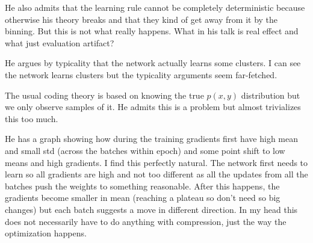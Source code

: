 He also admits that the learning rule cannot be completely deterministic because otherwise his theory breaks and that they kind of get away from it by the binning. But this is not what really happens. What in his talk is real effect and what just evaluation artifact?

He argues by typicality that the network actually learns some clusters. I can see the network learns clusters but the typicality arguments seem far-fetched.

The usual coding theory is based on knowing the true $p(x,y)$ distribution but we only observe samples of it. He admits this is a problem but almost trivializes this too much.

He has a graph showing how during the training gradients first have high mean and small std (across the batches within epoch) and some point shift to low means and high gradients. I find this perfectly natural. The network first needs to learn so all gradients are high and not too different as all the updates from all the batches push the weights to something reasonable. After this happens, the gradients become smaller in mean (reaching a plateau so don't need so big changes) but each batch suggests a move in different direction. In my head this does not necessarily have to do anything with compression, just the way the optimization happens.

